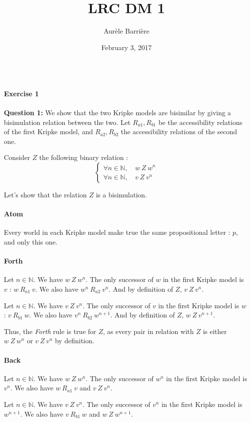 \documentclass[10pt]{article}
\author{Aur\`ele Barri\`ere}
\title{\vspace{-3.5cm}LRC DM 1}
\date{February 3, 2017}
\def\exercise#1{\ \vspace{1cm}\\\Large\textbf{Exercise #1}\normalsize\\}
\def\question#1{\ \vspace{1cm}\\\textbf{Question #1:}\quad}
\begin{document}
\maketitle

\exercise{1}
\question{1} 
We show that the two Kripke models are bisimilar by giving a bisimulation relation between the two.
Let $R_{a1}, R_{b1}$ be the accessibility relations of the first Kripke model, and $R_{a2}, R_{b2}$ the accessibility relations of the second one.

Consider $Z$ the following binary relation :
$$\left\{
\begin{array}{l}
\forall n\in\mathbb{N},\quad w\ Z\ w^n \\
\forall n\in\mathbb{N},\quad v\ Z\ v^n
\end{array} 
\right.$$

Let's show that the relation $Z$ is a bisimulation.
\paragraph{Atom} Every world in each Kripke model make true the same propositional letter  : $p$, and only this one. 

\paragraph{Forth} Let $n\in\mathbb{N}$. We have $w\ Z\ w^n$. The only successor of $w$ in the first Kripke model is $v$ : $w\ R_{a1}\ v$. We also have $w^n\ R_{a2}\ v^n$. And by definition of $Z$, $v\ Z\ v^n$.

Let $n\in\mathbb{N}$. We have $v\ Z\ v^n$. The only successor of $v$ in the first Kripke model is $w$ : $v\ R_{b1}\ w$. We also have $v^n\ R_{b2}\ w^{n+1}$. And by definition of $Z$, $w\ Z\ v^{n+1}$.

Thus, the \textit{Forth} rule is true for $Z$, as every pair in relation with $Z$ is either $w\ Z\ w^n$ or $v\ Z\ v^n$ by definition.

\paragraph{Back} Let $n\in\mathbb{N}$. We have $w\ Z\ w^n$. The only successor of $w^n$ in the first Kripke model is $v^n$. We also have $w\ R_{a1}\ v$ and $v\ Z\ v^n$. 

 Let $n\in\mathbb{N}$. We have $v\ Z\ v^n$. The only successor of $v^n$ in the first Kripke model is $w^{n+1}$. We also have $v\ R_{b1}\ w$ and $w\ Z\ w^{n+1}$. 
\end{document}
